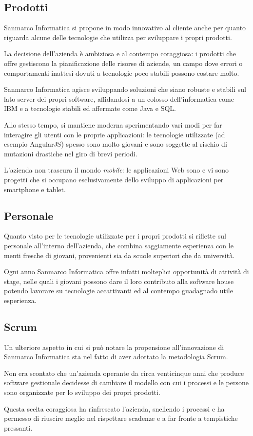 \subsection{Prodotti} \mbox{}

Sanmarco Informatica si propone in modo innovativo al cliente anche per quanto
riguarda alcune delle tecnologie che utilizza per sviluppare i propri prodotti.

La decisione dell'azienda è ambiziosa e al contempo coraggiosa: i prodotti che
offre gestiscono la pianificazione delle risorse di aziende, un campo dove
errori o comportamenti inattesi dovuti a tecnologie poco stabili possono
costare molto.

Sanmarco Informatica agisce sviluppando soluzioni che siano robuste e stabili
sul lato server dei propri software, affidandosi a un colosso dell'informatica
come IBM e a tecnologie stabili ed affermate come Java e SQL.

Allo stesso tempo, si mantiene moderna sperimentando vari modi per far
interagire gli utenti con le proprie applicazioni: le tecnologie utilizzate (ad
esempio AngularJS) spesso sono molto giovani e sono soggette al rischio di
mutazioni drastiche nel giro di brevi periodi.

L'azienda non trascura il mondo \emph{mobile}: le applicazioni Web sono
 e vi sono progetti che si occupano esclusivamente dello
sviluppo di applicazioni per smartphone e tablet.

\subsection{Personale} \mbox{}

Quanto visto per le tecnologie utilizzate per i propri prodotti si riflette sul
personale all'interno dell'azienda, che combina saggiamente esperienza con le
menti fresche di giovani, provenienti sia da scuole superiori che da
università.

Ogni anno Sanmarco Informatica offre infatti molteplici opportunità di attività
di stage, nelle quali i giovani possono dare il loro contributo alla software
house potendo lavorare su tecnologie accattivanti ed al contempo guadagnado
utile esperienza.

\subsection{Scrum} \mbox{}

Un ulteriore aspetto in cui si può notare la propensione all'innovazione di
Sanmarco Informatica sta nel fatto di aver adottato la metodologia Scrum.

Non era scontato che un'azienda operante da circa venticinque anni che produce
software gestionale decidesse di cambiare il modello con cui i processi e le
persone sono organizzate per lo sviluppo dei propri prodotti.

Questa scelta coraggiosa ha rinfrescato l'azienda, snellendo i processi e ha
permesso di riuscire meglio nel rispettare scadenze e a far fronte a
tempistiche pressanti.
